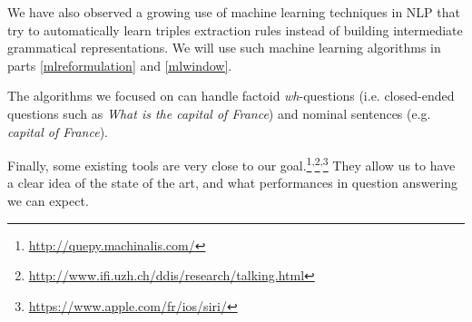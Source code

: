 We have also observed a growing use of machine learning techniques in NLP that try to automatically learn triples extraction rules instead of building intermediate grammatical representations. We will use such machine learning algorithms in parts \ref{mlreformulation} and \ref{mlwindow}.

The algorithms we focused on can handle factoid \textit{wh}-questions (i.e. closed-ended questions such as \textit{What is the capital of France}) and nominal sentences (e.g. \textit{capital of France}). 

Finally, some existing tools are very close to our goal.\footnote{\url{http://quepy.machinalis.com/}}\textsuperscript{,}\footnote{\url{http://www.ifi.uzh.ch/ddis/research/talking.html}}\textsuperscript{,}\footnote{\url{https://www.apple.com/fr/ios/siri/}} They allow us to have a clear idea of the state of the art, and what performances in question answering we can expect.
